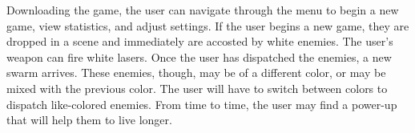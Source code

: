 Downloading the game, the user can navigate through the menu to
begin a new game, view statistics, and adjust settings.  If the
user begins a new game, they are dropped in a scene and immediately
are accosted by white enemies.  The user's weapon can fire white
lasers.  Once the user has dispatched the enemies, a new swarm arrives.
These enemies, though, may be of a different color, or may be
mixed with the previous color.  The user will have to switch
between colors to dispatch like-colored enemies.  From time to time,
the user may find a power-up that will help them to live longer.
